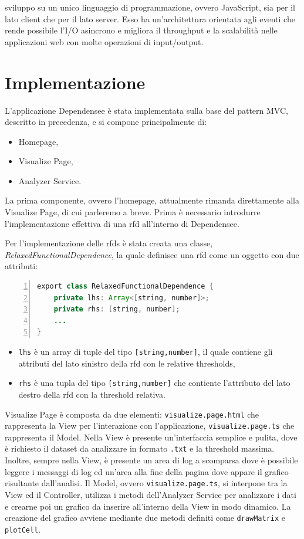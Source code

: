 sviluppo su un unico linguaggio di programmazione, ovvero JavaScript, sia per il lato client che per il lato server. Esso ha un'architettura orientata agli eventi che rende possibile l'I/O asincrono e migliora il throughput e la scalabilit\`{a} nelle applicazioni web con molte operazioni di input/output.

\section{Implementazione}
L'applicazione Dependensee \`{e} stata implementata sulla base del pattern MVC, descritto in precedenza, e si compone principalmente di:
\begin{itemize}
    \item Homepage,
    \item Visualize Page,
    \item Analyzer Service.
\end{itemize}
La prima componente, ovvero l'homepage, attualmente rimanda direttamente alla Visualize Page, di cui parleremo a breve. Prima \`{e} necessario introdurre l'implementazione effettiva di una \acrlong{rfd} all'interno di Dependensee.\par
Per l'implementazione delle \acrshort{rfds} \`{e} stata creata una classe, \textit{RelaxedFunctionalDependence}, la quale definisce una \acrshort{rfd} come un oggetto con due attributi:
\begin{lstlisting}[language=java, numbers=left, xleftmargin=3em, captionpos=b, caption={Implementazione delle \acrshort{rfds} in Dependensee.}, frame=lines]
export class RelaxedFunctionalDependence {
    private lhs: Array<[string, number]>;
    private rhs: [string, number];
    ...
}
\end{lstlisting}
\begin{itemize}
    \item \texttt{lhs} \`{e} un array di tuple del tipo \texttt{[string,number]}, il quale contiene gli attributi del lato sinistro della \acrshort{rfd} con le relative thresholds,
    \item \texttt{rhs} \`{e} una tupla del tipo \texttt{[string,number]} che contiente l'attributo del lato destro della \acrshort{rfd} con la threshold relativa.
\end{itemize}
Visualize Page \`{e} composta da due elementi: \texttt{visualize.page.html} che rappresenta la View per l'interazione con l'applicazione, \texttt{visualize.page.ts} che rappresenta il Model. Nella View \`{e} presente un'interfaccia semplice e pulita, dove \`{e} richiesto il dataset da analizzare in formato \texttt{.txt} e la threshold massima. Inoltre, sempre nella View, \`{e} presente un area di log a scomparsa dove \`{e} possibile leggere i messaggi di log ed un'area alla fine della pagina dove appare il grafico risultante dall'analisi. Il Model, ovvero \texttt{visualize.page.ts}, si interpone tra la View ed il Controller, utilizza i metodi dell'Analyzer Service per analizzare i dati e crearne poi un grafico da inserire all'interno della View in modo dinamico. La creazione del grafico avviene mediante due metodi definiti come \texttt{drawMatrix} e \texttt{plotCell}.
